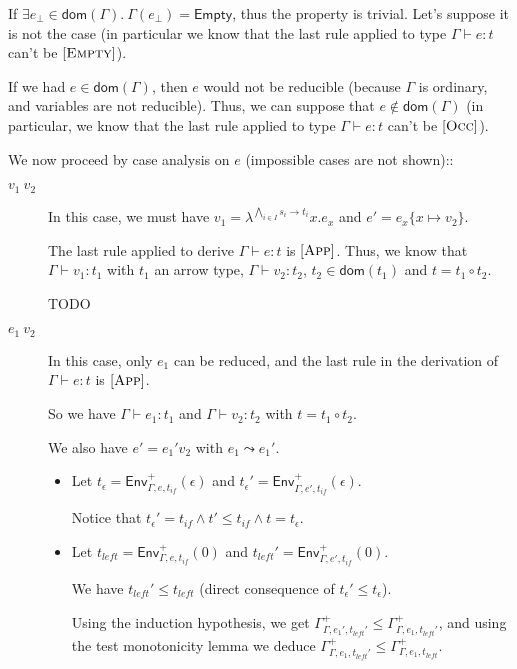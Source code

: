 \documentclass[a4paper]{article}%
\newcommand{\apply}[2]{#1\circ#2}
\newcommand{\dom}[1]{\textsf{dom}(#1)}
\newcommand{\Empty} {\textsf{Empty}}%
\newcommand{\subst}[2]{\{#1 \mapsto #2\}}
\newcommand{\Gp}[2]{\textsf{Env}^{#1}_{#2}}
\theoremstyle{definition}
\newcommand {\Rule}[1] {[\textsc{#1}]}
\begin{document}
    If $\exists e_{\bot} \in \dom\Gamma.\ \Gamma(e_{\bot}) = \Empty$, thus the property is trivial.
    Let's suppose it is not the case (in particular we know that the last rule applied to type $\Gamma \vdash e:t$ can't be $\Rule{Empty}$).

    If we had $e\in\dom\Gamma$, then $e$ would not be reducible (because $\Gamma$ is ordinary, and variables are not reducible).
    Thus, we can suppose that $e\not\in\dom\Gamma$ (in particular, we know that the last rule applied to type $\Gamma \vdash e:t$ can't be $\Rule{Occ}$).

    We now proceed by case analysis on $e$ (impossible cases are not shown)::

    \begin{description}
      \item[$v_1\ v_2$] In this case, we must have $v_1=\lambda^{\bigwedge_{i\in I} s_i \rightarrow t_i}x.e_x$ and $e'=e_x\subst x {v_2}$.

      The last rule applied to derive $\Gamma \vdash e:t$ is $\Rule{App}$.
      Thus, we know that $\Gamma \vdash v_1 : t_1$ with $t_1$ an arrow type, $\Gamma \vdash v_2 : t_2$, $t_2 \in \dom {t_1}$ and $t=\apply {t_1} {t_2}$.
      
      TODO

      \item[$e_1\ v_2$] In this case, only $e_1$ can be reduced, and the last rule in the derivation of $\Gamma \vdash e:t$ is $\Rule{App}$.
      
      So we have $\Gamma \vdash e_1:t_1$ and $\Gamma \vdash v_2:t_2$ with $t=\apply {t_1} {t_2}$.

      We also have $e' = e_1' v_2$ with $e_1 \leadsto e_1'$.

      \begin{itemize}
        \item Let $t_\epsilon = \Gp + {\Gamma,e,t_{if}} (\epsilon)$ and $t_\epsilon' = \Gp + {\Gamma,e',t_{if}} (\epsilon)$.
        
        Notice that $t_\epsilon' = t_{if} \land t' \leq t_{if} \land t = t_\epsilon$.

        \item Let $t_{left} = \Gp + {\Gamma,e,t_{if}} (0)$ and $t_{left}' = \Gp + {\Gamma,e',t_{if}} (0)$.

        We have $t_{left}' \leq t_{left}$ (direct consequence of $t_\epsilon' \leq t_\epsilon$).
  
        Using the induction hypothesis, we get $\Gamma^+_{\Gamma,e_1',t_{left}'} \leq \Gamma^+_{\Gamma,e_1,t_{left}'}$,
        and using the test monotonicity lemma we deduce $\Gamma^+_{\Gamma,e_1,t_{left}'} \leq \Gamma^+_{\Gamma,e_1,t_{left}}$.


\end{itemize}
\end{description}
\end{document}
